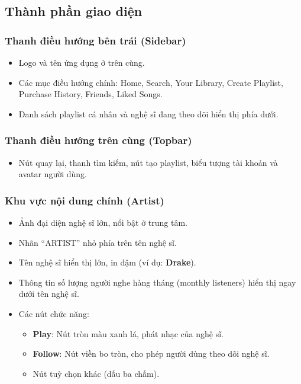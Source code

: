 \documentclass{book}
\begin{document}
\subsection{Thành phần giao diện}

\subsubsection{Thanh điều hướng bên trái (Sidebar)}
\begin{itemize}
    \item Logo và tên ứng dụng ở trên cùng.
    \item Các mục điều hướng chính: Home, Search, Your Library, Create Playlist, Purchase History, Friends, Liked Songs.
    \item Danh sách playlist cá nhân và nghệ sĩ đang theo dõi hiển thị phía dưới.
\end{itemize}

\subsubsection{Thanh điều hướng trên cùng (Topbar)}
\begin{itemize}
    \item Nút quay lại, thanh tìm kiếm, nút tạo playlist, biểu tượng tài khoản và avatar người dùng.
\end{itemize}

\subsubsection{Khu vực nội dung chính (Artist)}
\begin{itemize}
    \item Ảnh đại diện nghệ sĩ lớn, nổi bật ở trung tâm.
    \item Nhãn “ARTIST” nhỏ phía trên tên nghệ sĩ.
    \item Tên nghệ sĩ hiển thị lớn, in đậm (ví dụ: \textbf{Drake}).
    \item Thông tin số lượng người nghe hàng tháng (monthly listeners) hiển thị ngay dưới tên nghệ sĩ.
    \item Các nút chức năng:
    \begin{itemize}
        \item \textbf{Play}: Nút tròn màu xanh lá, phát nhạc của nghệ sĩ.
        \item \textbf{Follow}: Nút viền bo tròn, cho phép người dùng theo dõi nghệ sĩ.
        \item Nút tuỳ chọn khác (dấu ba chấm).
    \end{itemize}
\end{itemize}
\end{document}

